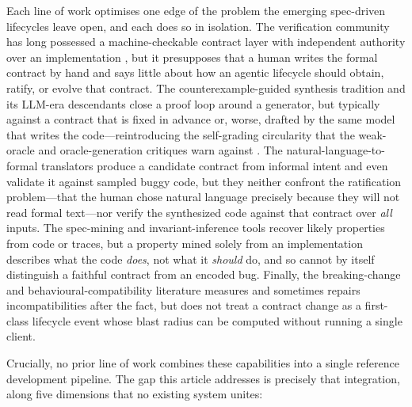 Each line of work optimises one edge of the problem the emerging spec-driven lifecycles leave open, and each does so in isolation. The verification community has long possessed a machine-checkable contract layer with independent authority over an implementation \cite{meyer1992dbc,cok2014openjml,leino2010dafny}, but it presupposes that a human writes the formal contract by hand and says little about how an agentic lifecycle should obtain, ratify, or evolve that contract. The counterexample-guided synthesis tradition \cite{solarlezama2008sketching,alur2013sygus} and its LLM-era descendants \cite{sun2024clover,misu2024dafny,mugnier2025dafnypro} close a proof loop around a generator, but typically against a contract that is fixed in advance or, worse, drafted by the same model that writes the code---reintroducing the self-grading circularity that the weak-oracle and oracle-generation critiques warn against \cite{liu2023evalplus,liu2026oracle}. The natural-language-to-formal translators \cite{cosler2023nl2spec,endres2024nl2postcond,ma2025specgen} produce a candidate contract from informal intent and even validate it against sampled buggy code, but they neither confront the ratification problem---that the human chose natural language precisely because they will not read formal text---nor verify the synthesized code against that contract over \emph{all} inputs. The spec-mining and invariant-inference tools \cite{ernst2007daikon,ammons2002mining,si2018learning} recover likely properties from code or traces, but a property mined solely from an implementation describes what the code \emph{does}, not what it \emph{should} do, and so cannot by itself distinguish a faithful contract from an encoded bug. Finally, the breaking-change and behavioural-compatibility literature \cite{mostafa2017behavioral,ochoa2022breaking,jayasuriya2024understanding,islam2025byam} measures and sometimes repairs incompatibilities after the fact, but does not treat a contract change as a first-class lifecycle event whose blast radius can be computed without running a single client.

Crucially, no prior line of work combines these capabilities into a single reference development pipeline. The gap this article addresses is precisely that integration, along five dimensions that no existing system unites:

